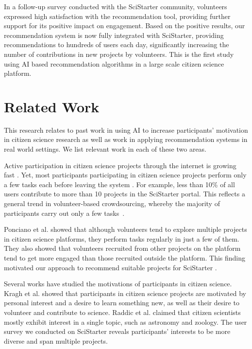 \documentclass[letterpaper]{article} %
\begin{document}
In a  follow-up survey conducted with the SciStarter community, volunteers
expressed high satisfaction with the recommendation tool, providing further support for its positive impact on engagement.
Based on the positive results, our recommendation system is now fully integrated with SciStarter,  providing
recommendations to hundreds of users each day, significantly increasing
the number of contributions in new projects by volunteers.  This is the first study using AI based recommendation algorithms in a large scale  citizen science platform.

\section{Related Work}
 This research relates to past work in using AI to increase participants' motivation in  citizen science research as well as work in applying recommendation systems in real world settings. We list relevant work in each of these two areas.

Active  participation  in citizen science projects through the internet is growing  fast \cite{nov2014scientists,Irwin2018NoPN}. Yet, most participants   participating in citizen science projects perform only a few tasks each before leaving the system \cite{rotman2012dynamic}. For example,  less than 10\% of all users   contribute to more than 10 projects in the SciStarter portal.
This reflects a general trend in  volunteer-based crowdsourcing, whereby  the majority of participants carry out only a few tasks~\cite{segal2016intervention,segal2015improving}.


 Ponciano et al.    showed that although volunteers tend to explore multiple projects in citizen science platforms,  they perform tasks regularly in just a few of them. They   also showed that volunteers recruited from other projects on the platform tend to get more engaged than those recruited outside the platform. This finding motivated our approach
to recommend suitable projects for  SciStarter .

Several works  have studied the motivations of participants  in citizen science.
Kragh et al.  showed that participants in citizen science projects are motivated by personal interest and a desire to learn something new, as well as their desire to volunteer and contribute to science.
Raddic et al.   claimed that citizen scientists  mostly exhibit interest in a single  topic, such as astronomy and zoology. The  user survey  we
conducted on SciStarter reveals participants'  interests to be more diverse and span multiple projects.
\end{document}
